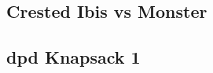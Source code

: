         \subsection{Crested Ibis vs Monster}
                
        \subsection{dpd Knapsack 1}
                
%                 
%                 
%                 
%                 
%                 
%                 
%                 

